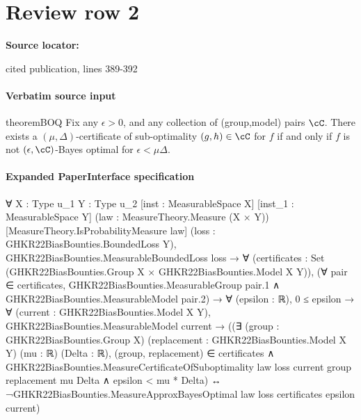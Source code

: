 \documentclass[10pt]{article}
\begin{document}
\section*{Review row 2}
\textbf{Source locator:} {\footnotesize\raggedright cited publication, lines 389-\allowbreak{}392\par}
\paragraph{Verbatim source input}
\begin{ReviewVerbatim}
\begin{restatable}{theorem}{BOQ}
\label{thm:BOQ}
Fix any $\epsilon > 0$, and any collection of (group,model) pairs $\cC$. There exists a $(\mu,\Delta)$-certificate of sub-optimality $(g,h) \in \cC$ for $f$ if and only if $f$ is not $(\epsilon,\cC)$-Bayes optimal for $\epsilon < \mu\Delta$.
\end{restatable}
\end{ReviewVerbatim}



\paragraph{Expanded PaperInterface specification}
\begin{ReviewVerbatim}
∀ {X : Type u_1} {Y : Type u_2} [inst : MeasurableSpace X] [inst_1 : MeasurableSpace Y]
  (law : MeasureTheory.Measure (X × Y)) [MeasureTheory.IsProbabilityMeasure law]
  (loss : GHKR22BiasBounties.BoundedLoss Y),
  GHKR22BiasBounties.MeasurableBoundedLoss loss →
    ∀ (certificates : Set (GHKR22BiasBounties.Group X × GHKR22BiasBounties.Model X Y)),
      (∀ pair ∈ certificates, GHKR22BiasBounties.MeasurableGroup pair.1 ∧ GHKR22BiasBounties.MeasurableModel pair.2) →
        ∀ (epsilon : ℝ),
          0 ≤ epsilon →
            ∀ (current : GHKR22BiasBounties.Model X Y),
              GHKR22BiasBounties.MeasurableModel current →
                ((∃ (group : GHKR22BiasBounties.Group X) (replacement : GHKR22BiasBounties.Model X Y) (mu : ℝ) (Delta :
                    ℝ),
                    (group, replacement) ∈ certificates ∧
                      GHKR22BiasBounties.MeasureCertificateOfSuboptimality law loss current group replacement mu Delta ∧
                        epsilon < mu * Delta) ↔
                  ¬GHKR22BiasBounties.MeasureApproxBayesOptimal law loss certificates epsilon current)
\end{ReviewVerbatim}
\end{document}
